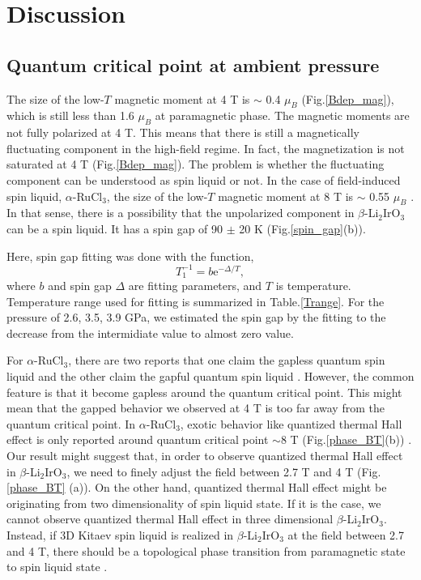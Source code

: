 \chapter{Discussion}
\section{Quantum critical point at ambient pressure}
The size of the low-$T$ magnetic moment at 4 T is $\sim$ 0.4 $\mu_B$ (Fig.\ref{Bdep_mag}), which is still less than 1.6 $\mu_B$ at paramagnetic phase.
The magnetic moments are not fully polarized at 4 T.
This means that there is still a magnetically fluctuating component in the high-field regime.
In fact, the magnetization is not saturated at 4 T (Fig.\ref{Bdep_mag}).
The problem is whether the fluctuating component can be understood as spin liquid or not.
In the case of field-induced spin liquid, $\alpha$-RuCl$_3$, the size of the low-$T$ magnetic moment at 8 T is $\sim$ 0.55 $\mu_B$ \cite{Zheng2017}.
In that sense, there is a possibility that the unpolarized component in $\beta$-Li$_2$IrO$_3$ can be a spin liquid.
It has a spin gap of 90 $\pm$ 20 K (Fig.\ref{spin_gap}(b)).

Here, spin gap fitting was done with the function,
\begin{equation}
T^{-1}_1 = b\mathrm{e}^{-\Delta/T},
\end{equation}
where $b$ and spin gap $\Delta$ are fitting parameters, and $T$ is temperature.
Temperature range used for fitting is summarized in Table.\ref{Trange}.
For the pressure of 2.6, 3.5, 3.9 GPa, we estimated the spin gap by the fitting to the decrease from the intermidiate value to almost zero value.

For $\alpha$-RuCl$_3$, there are two reports that one claim the gapless quantum spin liquid \cite{Zheng2017} and the other claim the gapful quantum spin liquid \cite{baek2017evidence}.
However, the common feature is that it become gapless around the quantum critical point.
This might mean that the gapped behavior we observed at 4 T is too far away from the quantum critical point.
In $\alpha$-RuCl$_3$, exotic behavior like quantized thermal Hall effect is only reported around quantum critical point $\sim 8$ T (Fig.\ref{phase_BT}(b)) \cite{kasahara2018majorana}.
Our result might suggest that, in order to observe quantized thermal Hall effect in $\beta$-Li$_2$IrO$_3$, we need to finely adjust the field between 2.7 T and 4 T
(Fig.\ref{phase_BT} (a)).
On the other hand, quantized thermal Hall effect might be originating from two dimensionality of spin liquid state.
If it is the case, we cannot observe quantized thermal Hall effect in three dimensional $\beta$-Li$_2$IrO$_3$.
Instead, if 3D Kitaev spin liquid is realized in $\beta$-Li$_2$IrO$_3$ at the field between 2.7 and 4 T, there should be a topological phase transition from paramagnetic state to
spin liquid state \cite{nasu2014vaporization}.

